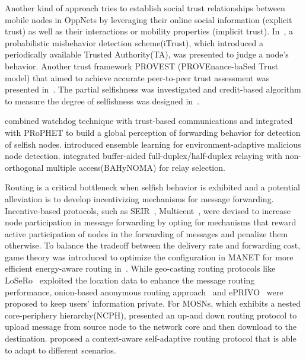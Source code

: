 Another kind of approach tries to establish social trust relationships
between mobile nodes in OppNets by leveraging their online social information
(explicit trust) as well as their interactions or mobility properties (implicit trust).
In~\cite{DBLP:journals/tpds/ZhuDGDC14}, a probabilistic misbehavior detection scheme(iTrust),
which introduced a periodically available Trusted Authority(TA),
was presented to judge a node's behavior.
Another trust framework PROVEST (PROVEnance-baSed Trust model)
that aimed to achieve accurate peer-to-peer trust assessment was presented
in~\cite{DBLP:journals/tdsc/ChoC18}.
The partial selfishness was investigated and credit-based algorithm to
measure the degree of selfishness was designed in~\cite{DBLP:journals/tmc/ChoiSLW12}.

\cite{DBLP:journals/jnca/BasuBRB18} combined watchdog technique
with trust-based communications and integrated with PRoPHET
to build a global perception of forwarding behavior for detection of selfish nodes.
\cite{DBLP:conf/icdcs/GaoMAH18} introduced ensemble learning
for environment-adaptive malicious node detection.
\cite{DBLP:journals/tvt/NomikosCVWK20} integrated
buffer-aided full-duplex/half-duplex relaying with
non-orthogonal multiple access(BAHyNOMA) for relay selection.

Routing is a critical bottleneck when selfish behavior
is exhibited and a potential alleviation is to
develop incentivizing mechanisms for message forwarding.
Incentive-based protocols, such as SEIR~\cite{DBLP:conf/ciss/ChhabraVS17},
Multicent~\cite{DBLP:journals/tpds/ChenSY15},
were devised to increase node participation in message forwarding
by opting for mechanisms that reward active participation of nodes
in the forwarding of messages and penalize them otherwise.
To balance the tradeoff between the delivery rate and forwarding cost,
game theory was introduced to optimize the configuration in MANET
for more efficient energy-aware routing in~\cite{DBLP:journals/monet/MaoZ15}.
While geo-casting routing protocols like LoSeRo~\cite{DBLP:journals/tmc/CostantinoMMS20}
exploited the location data to enhance the message routing performance,
onion-based anonymous routing approach~\cite{DBLP:conf/icdcs/SakaiSKWA16}
and ePRIVO~\cite{DBLP:journals/tvt/MagaiaBPC18} were proposed
to keep users' information private.
For MOSNs, which exhibits a nested core-periphery hierarchy(NCPH),
\cite{DBLP:journals/tvt/Zheng017} presented an up-and down routing protocol
to upload message from source node to the network core
and then download to the destination.
\cite{DBLP:journals/adhoc/RosasGH20} proposed
a context-aware self-adaptive routing protocol
that is able to adapt to different scenarios.


